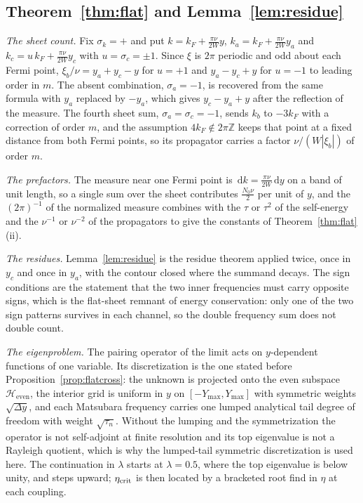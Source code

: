 \documentclass[11pt]{article}
\newcommand{\dd}{\,\mathrm d}
\theoremstyle{definition}
\theoremstyle{remark}
\begin{document}
\subsection{Theorem~\ref{thm:flat} and Lemma~\ref{lem:residue}}

\emph{The sheet count.} Fix $\sigma_k=+$ and put $k=k_F+\frac{\pi\nu}{2W}y$, $k_a=k_F+\frac{\pi\nu}{2W}y_a$ and $k_c=u\,k_F+\frac{\pi\nu}{2W}y_c$ with $u=\sigma_c=\pm1$. Since $\xi$ is $2\pi$ periodic and odd about each Fermi point, $\xi_b/\nu=y_a+y_c-y$ for $u=+1$ and $y_a-y_c+y$ for $u=-1$ to leading order in $m$. The absent combination, $\sigma_a=-1$, is recovered from the same formula with $y_a$ replaced by $-y_a$, which gives $y_c-y_a+y$ after the reflection of the measure. The fourth sheet sum, $\sigma_a=\sigma_c=-1$, sends $k_b$ to $-3k_F$ with a correction of order $m$, and the assumption $4k_F\notin2\pi\mathbb Z$ keeps that point at a fixed distance from both Fermi points, so its propagator carries a factor $\nu/(W|\xi_b|)$ of order $m$.

\emph{The prefactors.} The measure near one Fermi point is $\dd k=\frac{\pi\nu}{2W}\dd y$ on a band of unit length, so a single sum over the sheet contributes $\frac{N_0\nu}{2}$ per unit of $y$, and the $(2\pi)^{-1}$ of the normalized measure combines with the $\tau$ or $\tau^2$ of the self-energy and the $\nu^{-1}$ or $\nu^{-2}$ of the propagators to give the constants of Theorem~\ref{thm:flat}(ii).

\emph{The residues.} Lemma~\ref{lem:residue} is the residue theorem applied twice, once in $y_c$ and once in $y_a$, with the contour closed where the summand decays. The sign conditions are the statement that the two inner frequencies must carry opposite signs, which is the flat-sheet remnant of energy conservation: only one of the two sign patterns survives in each channel, so the double frequency sum does not double count.

\emph{The eigenproblem.} The pairing operator of the limit acts on $y$-dependent functions of one variable. Its discretization is the one stated before Proposition~\ref{prop:flatcross}: the unknown is projected onto the even subspace $\mathcal H_{\mathrm{even}}$, the interior grid is uniform in $y$ on $[-Y_{\max},Y_{\max}]$ with symmetric weights $\sqrt{\Delta y}$, and each Matsubara frequency carries one lumped analytical tail degree of freedom with weight $\sqrt{\tau_n}$. Without the lumping and the symmetrization the operator is not self-adjoint at finite resolution and its top eigenvalue is not a Rayleigh quotient, which is why the lumped-tail symmetric discretization is used here. The continuation in $\lambda$ starts at $\lambda=0.5$, where the top eigenvalue is below unity, and steps upward; $\eta_{\rm crit}$ is then located by a bracketed root find in $\eta$ at each coupling.
\end{document}
